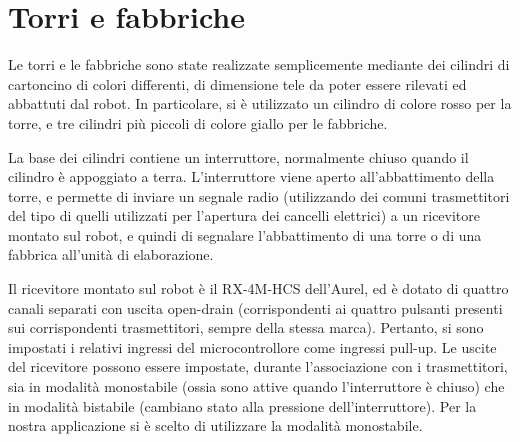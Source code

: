 \section{Torri e fabbriche}
Le torri e le fabbriche sono state realizzate semplicemente mediante dei cilindri di cartoncino di colori differenti, di dimensione tele da poter essere rilevati ed abbattuti dal robot. In particolare, si è utilizzato un cilindro di colore rosso per la torre, e tre cilindri più piccoli di colore giallo per le fabbriche. 

La base dei cilindri contiene un interruttore, normalmente chiuso quando il cilindro è appoggiato a terra. L'interruttore viene aperto all'abbattimento della torre, e permette di inviare un segnale radio (utilizzando dei comuni trasmettitori del tipo di quelli utilizzati per l'apertura dei cancelli elettrici) a un ricevitore montato sul robot, e quindi di segnalare l'abbattimento di una torre o di una fabbrica all'unità di elaborazione.

Il ricevitore montato sul robot è il RX-4M-HCS dell'Aurel, ed è dotato di quattro canali separati con uscita open-drain (corrispondenti ai quattro pulsanti presenti sui corrispondenti trasmettitori, sempre della stessa marca). Pertanto, si sono impostati i relativi ingressi del microcontrollore come ingressi pull-up. Le uscite del ricevitore possono essere impostate, durante l'associazione con i trasmettitori, sia in modalità monostabile (ossia sono attive quando l'interruttore è chiuso) che in modalità bistabile (cambiano stato alla pressione dell'interruttore). Per la nostra applicazione si è scelto di utilizzare la modalità monostabile. 